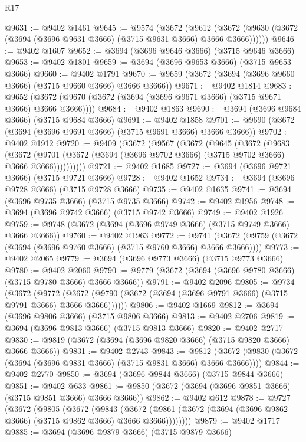 \begin{lexlean}{R17}
\begin{coremodule}
@9631 := @9402 @1461
@9645 := @9574
    (@3672
      (@9612 (@3672 (@9630 (@3672 (@3694 (@3696 @9631 @3666) (@3715 @9631 @3666) @3666 @3666))))))
@9646 := @9402 @1607
@9652 := @3694 (@3696 @9646 @3666) (@3715 @9646 @3666)
@9653 := @9402 @1801
@9659 := @3694 (@3696 @9653 @3666) (@3715 @9653 @3666)
@9660 := @9402 @1791
@9670 := @9659 (@3672 (@3694 (@3696 @9660 @3666) (@3715 @9660 @3666) @3666 @3666))
@9671 := @9402 @1814
@9683 := @9652 (@3672 (@9670 (@3672 (@3694 (@3696 @9671 @3666) (@3715 @9671 @3666) @3666 @3666))))
@9684 := @9402 @1863
@9690 := @3694 (@3696 @9684 @3666) (@3715 @9684 @3666)
@9691 := @9402 @1858
@9701 := @9690 (@3672 (@3694 (@3696 @9691 @3666) (@3715 @9691 @3666) @3666 @3666))
@9702 := @9402 @1912
@9720 := @9409
    (@3672
      (@9567
        (@3672
          (@9645
            (@3672
              (@9683
                (@3672
                  (@9701 (@3672 (@3694 (@3696 @9702 @3666) (@3715 @9702 @3666) @3666 @3666))))))))))
@9721 := @9402 @1685
@9727 := @3694 (@3696 @9721 @3666) (@3715 @9721 @3666)
@9728 := @9402 @1652
@9734 := @3694 (@3696 @9728 @3666) (@3715 @9728 @3666)
@9735 := @9402 @1635
@9741 := @3694 (@3696 @9735 @3666) (@3715 @9735 @3666)
@9742 := @9402 @1956
@9748 := @3694 (@3696 @9742 @3666) (@3715 @9742 @3666)
@9749 := @9402 @1926
@9759 := @9748 (@3672 (@3694 (@3696 @9749 @3666) (@3715 @9749 @3666) @3666 @3666))
@9760 := @9402 @1963
@9772 := @9741 (@3672 (@9759 (@3672 (@3694 (@3696 @9760 @3666) (@3715 @9760 @3666) @3666 @3666))))
@9773 := @9402 @2065
@9779 := @3694 (@3696 @9773 @3666) (@3715 @9773 @3666)
@9780 := @9402 @2060
@9790 := @9779 (@3672 (@3694 (@3696 @9780 @3666) (@3715 @9780 @3666) @3666 @3666))
@9791 := @9402 @2096
@9805 := @9734
    (@3672
      (@9772 (@3672 (@9790 (@3672 (@3694 (@3696 @9791 @3666) (@3715 @9791 @3666) @3666 @3666))))))
@9806 := @9402 @1669
@9812 := @3694 (@3696 @9806 @3666) (@3715 @9806 @3666)
@9813 := @9402 @2706
@9819 := @3694 (@3696 @9813 @3666) (@3715 @9813 @3666)
@9820 := @9402 @2717
@9830 := @9819 (@3672 (@3694 (@3696 @9820 @3666) (@3715 @9820 @3666) @3666 @3666))
@9831 := @9402 @2743
@9843 := @9812 (@3672 (@9830 (@3672 (@3694 (@3696 @9831 @3666) (@3715 @9831 @3666) @3666 @3666))))
@9844 := @9402 @2770
@9850 := @3694 (@3696 @9844 @3666) (@3715 @9844 @3666)
@9851 := @9402 @633
@9861 := @9850 (@3672 (@3694 (@3696 @9851 @3666) (@3715 @9851 @3666) @3666 @3666))
@9862 := @9402 @612
@9878 := @9727
    (@3672
      (@9805
        (@3672
          (@9843
            (@3672 (@9861 (@3672 (@3694 (@3696 @9862 @3666) (@3715 @9862 @3666) @3666 @3666))))))))
@9879 := @9402 @1717
@9885 := @3694 (@3696 @9879 @3666) (@3715 @9879 @3666)

\end{coremodule}
\end{lexlean}
